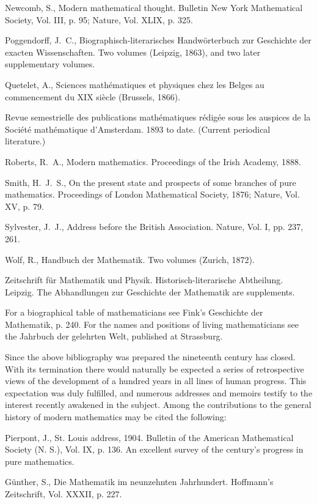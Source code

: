 \documentclass[oneside]{book}
\begin{document}
Newcomb, S., Modern mathematical thought. Bulletin New York
Mathematical Society, Vol. III, p. 95; Nature, Vol. XLIX, p. 325.

Poggendorff, J.~C., Biographisch-literarisches Handw\"orterbuch
zur Ge\-schi\-chte der exacten Wissenschaften. Two volumes (Leipzig,
1863), and two later supplementary volumes.

Quetelet, A., Sciences math\'ematiques et physiques chez les Belges
au commencement du XIX si\`ecle (Brussels, 1866).

Revue semestrielle des publications math\'ematiques r\'edig\'ee sous
les auspices de la Soci\'et\'e math\'ematique d'Amsterdam. 1893 to
date. (Current periodical literature.)

Roberts, R.~A., Modern mathematics. Proceedings of the Irish
Academy, 1888.

Smith, H.~J.~S., On the present state and prospects of some branches
of pure mathematics. Proceedings of London Mathematical Society,
1876; Nature, Vol. XV, p. 79.

Sylvester, J.~J., Address before the British Association. Nature,
Vol. I, pp. 237, 261.

Wolf, R., Handbuch der Mathematik. Two volumes (Zurich, 1872).

Zeitschrift f\"ur Mathematik und Physik. Historisch-literarische
Abtheilung. Leipzig. The Abhandlungen zur Geschichte der Mathematik
are supplements.

\bigskip

For a biographical table of mathematicians see Fink's Geschichte der
Mathematik, p. 240. For the names and positions of living
mathematicians see the Jahrbuch der gelehrten Welt, published at
Strassburg.

Since the above bibliography was prepared the nineteenth century has
closed. With its termination there would naturally be expected a
series of retrospective views of the development of a hundred years
in all lines of human progress. This expectation was duly
fulfilled, and numerous addresses and memoirs testify to the
interest recently awakened in the subject. Among the contributions
to the general history of modern mathematics may be cited the
following:

\bigskip
Pierpont, J., St. Louis address, 1904. Bulletin of the American
Mathematical Society (N. S.), Vol. IX, p. 136. An excellent survey
of the century's progress in pure mathematics.

G\"unther, S., Die Mathematik im neunzehnten Jahrhundert. Hoffmann's
Zeitschrift, Vol. XXXII, p. 227.
\end{document}
